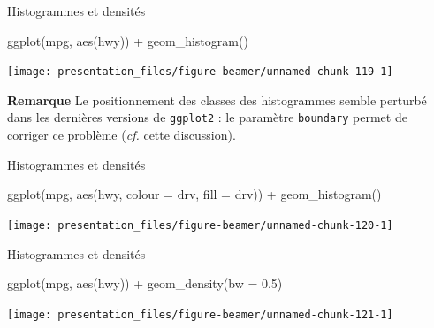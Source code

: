 \documentclass[12pt,handout,ignorenonframetext,]{beamer}
\newenvironment{Shaded}{}{}
\newcommand{\KeywordTok}[1]{\textcolor[rgb]{0.00,0.00,1.00}{#1}}
\newcommand{\DataTypeTok}[1]{#1}
\newcommand{\FloatTok}[1]{#1}
\newcommand{\StringTok}[1]{\textcolor[rgb]{0.00,0.50,0.50}{#1}}
\newcommand{\OperatorTok}[1]{#1}
\newcommand{\NormalTok}[1]{#1}
\renewenvironment{Shaded}{\begin{snugshade}}{\end{snugshade}}
\begin{document}
\begin{frame}[fragile]{Histogrammes et densités}

\footnotesize \center

\vspace{-0.3cm}

\begin{Shaded}
\begin{Highlighting}[]
\KeywordTok{ggplot}\NormalTok{(mpg, }\KeywordTok{aes}\NormalTok{(hwy)) }\OperatorTok{+}\StringTok{ }\KeywordTok{geom_histogram}\NormalTok{()}
\end{Highlighting}
\end{Shaded}

\texttt{[image: presentation\_files/figure-beamer/unnamed-chunk-119-1]}

\pause \raggedright \small \vspace{-0.3cm}

\textbf{Remarque} Le positionnement des classes des histogrammes semble
perturbé dans les dernières versions de \texttt{ggplot2} : le paramètre
\texttt{boundary} permet de corriger ce problème (\emph{cf.}
\href{http://stackoverflow.com/questions/37876096/geom-histogram-wrong-bins}{\underline{cette discussion}}).

\end{frame}

\begin{frame}[fragile]{Histogrammes et densités}

\footnotesize \center

\begin{Shaded}
\begin{Highlighting}[]
\KeywordTok{ggplot}\NormalTok{(mpg, }\KeywordTok{aes}\NormalTok{(hwy, }\DataTypeTok{colour =}\NormalTok{ drv, }\DataTypeTok{fill =}\NormalTok{ drv)) }\OperatorTok{+}\StringTok{ }
\StringTok{  }\KeywordTok{geom_histogram}\NormalTok{()}
\end{Highlighting}
\end{Shaded}

\texttt{[image: presentation\_files/figure-beamer/unnamed-chunk-120-1]}

\end{frame}

\begin{frame}[fragile]{Histogrammes et densités}

\footnotesize \center

\begin{Shaded}
\begin{Highlighting}[]
\KeywordTok{ggplot}\NormalTok{(mpg, }\KeywordTok{aes}\NormalTok{(hwy)) }\OperatorTok{+}\StringTok{ }\KeywordTok{geom_density}\NormalTok{(}\DataTypeTok{bw =} \FloatTok{0.5}\NormalTok{)}
\end{Highlighting}
\end{Shaded}

\texttt{[image: presentation\_files/figure-beamer/unnamed-chunk-121-1]}

\end{frame}
\end{document}
